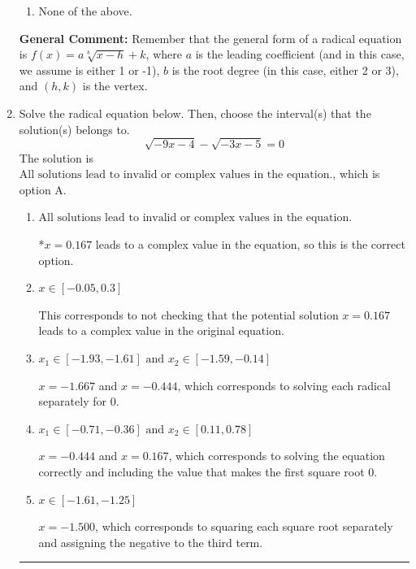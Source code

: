 \documentclass{extbook}[14pt]
\newcommand{\litem}[1]{\item #1

\rule{\textwidth}{0.4pt}}
\begin{document}
\begin{enumerate}
{\begin{enumerate}[label=\Alph*.]
\item None of the above.\end{enumerate}
\textbf{General Comment:} Remember that the general form of a radical equation is $ f(x) = a \sqrt[b]{x - h} + k $, where $a$ is the leading coefficient (and in this case, we assume is either 1 or -1), $b$ is the root degree (in this case, either 2 or 3), and $(h, k)$ is the vertex.
}
\litem{
Solve the radical equation below. Then, choose the interval(s) that the solution(s) belongs to.
\[ \sqrt{-9 x - 4} - \sqrt{-3 x - 5} = 0 \]The solution is \( \text{All solutions lead to invalid or complex values in the equation.} \), which is option A.\begin{enumerate}[label=\Alph*.]
\item \( \text{All solutions lead to invalid or complex values in the equation.} \)

*$x = 0.167$ leads to a complex value in the equation, so this is the correct option.
\item \( x \in [-0.05,0.3] \)

This corresponds to not checking that the potential solution $x = 0.167$ leads to a complex value in the original equation.
\item \( x_1 \in [-1.93, -1.61] \text{ and } x_2 \in [-1.59,-0.14] \)

$x = -1.667$ and $x = -0.444$, which corresponds to solving each radical separately for 0.
\item \( x_1 \in [-0.71, -0.36] \text{ and } x_2 \in [0.11,0.78] \)

$x = -0.444$ and $x = 0.167$, which corresponds to solving the equation correctly and including the value that makes the first square root 0.
\item \( x \in [-1.61,-1.25] \)

$x = -1.500$, which corresponds to squaring each square root separately and assigning the negative to the third term.
\end{enumerate}

}
\end{enumerate}
\end{document}
